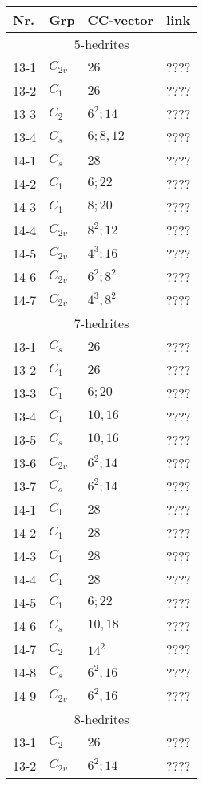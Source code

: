\documentclass[12pt]{article}
\begin{document}
\begin{table}
\begin{center}
{\small
\begin{minipage}{6cm}
\begin{tabular}{||l|l|l|l||}
\hline
Nr.	&Grp 	&CC-vector	&link\\\hline
\multicolumn{4}{||c||}{$5$-hedrites}\\\hline
13-1	&$C_{2v}$	&$26$		&????\\
13-2	&$C_1$	&$26$		&????\\
13-3	&$C_2$	&$6^2; 14$	&????\\
13-4	&$C_s$	&$6; 8, 12$	&????\\\hline
14-1	&$C_s$	&$28$		&????\\
14-2	&$C_1$	&$6; 22$		&????\\
14-3	&$C_1$	&$8; 20$		&????\\
14-4	&$C_{2v}$	&$8^2; 12$	&????\\
14-5	&$C_{2v}$	&$4^3; 16$	&????\\
14-6	&$C_{2v}$	&$6^2; 8^2$	&????\\
14-7	&$C_{2v}$	&$4^3, 8^2$	&????\\\hline
\hline
\multicolumn{4}{||c||}{$7$-hedrites}\\\hline
13-1	&$C_s$	&$26$		&????\\
13-2	&$C_1$	&$26$		&????\\
13-3	&$C_1$	&$6; 20$		&????\\
13-4	&$C_1$	&$10, 16$		&????\\
13-5	&$C_s$	&$10, 16$		&????\\
13-6	&$C_{2v}$	&$6^2; 14$	&????\\
13-7	&$C_{s}$	&$6^2; 14$	&????\\\hline
14-1	&$C_1$	&$28$		&????\\
14-2	&$C_1$	&$28$		&????\\
14-3	&$C_1$	&$28$		&????\\
14-4	&$C_1$	&$28$		&????\\
14-5	&$C_1$	&$6; 22$		&????\\
14-6	&$C_s$	&$10, 18$		&????\\
14-7	&$C_2$	&$14^2$		&????\\
14-8	&$C_s$	&$6^2, 16$	&????\\
14-9	&$C_{2v}$	&$6^2, 16$	&????\\\hline
\hline
\multicolumn{4}{||c||}{$8$-hedrites}\\\hline
13-1	&$C_2$	&$26$		&????\\
13-2	&$C_{2v}$	&$6^2; 14$	&????\\\hline

\end{tabular}
\end{minipage}}
\end{center}
\end{table}
\end{document}
